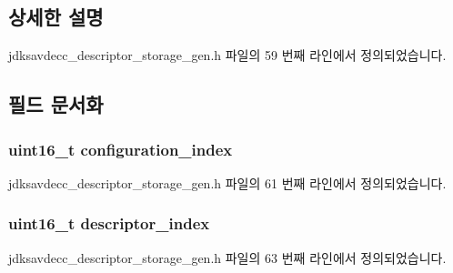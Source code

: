\subsection{상세한 설명}


jdksavdecc\+\_\+descriptor\+\_\+storage\+\_\+gen.\+h 파일의 59 번째 라인에서 정의되었습니다.



\subsection{필드 문서화}
\subsubsection[{\texorpdfstring{configuration\+\_\+index}{configuration_index}}]{\setlength{\rightskip}{0pt plus 5cm}uint16\+\_\+t configuration\+\_\+index}\hypertarget{structjdksavdecc__descriptor__storage__gen__symbol_afaad1bd7c66f9611e134d8c5ce98f444}{}\label{structjdksavdecc__descriptor__storage__gen__symbol_afaad1bd7c66f9611e134d8c5ce98f444}


jdksavdecc\+\_\+descriptor\+\_\+storage\+\_\+gen.\+h 파일의 61 번째 라인에서 정의되었습니다.

\subsubsection[{\texorpdfstring{descriptor\+\_\+index}{descriptor_index}}]{\setlength{\rightskip}{0pt plus 5cm}uint16\+\_\+t descriptor\+\_\+index}\hypertarget{structjdksavdecc__descriptor__storage__gen__symbol_a042bbc76d835b82d27c1932431ee38d4}{}\label{structjdksavdecc__descriptor__storage__gen__symbol_a042bbc76d835b82d27c1932431ee38d4}


jdksavdecc\+\_\+descriptor\+\_\+storage\+\_\+gen.\+h 파일의 63 번째 라인에서 정의되었습니다.

